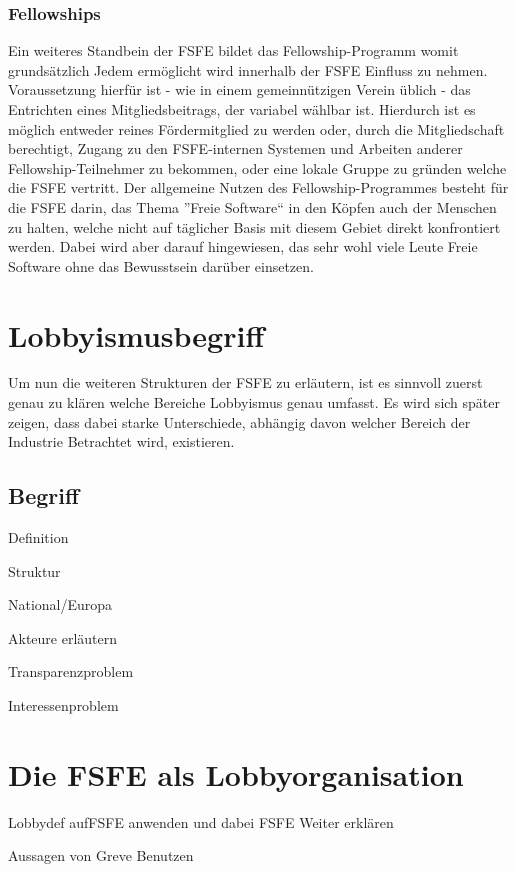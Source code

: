 \subsubsection{Fellowships}
Ein weiteres Standbein der FSFE bildet das Fellowship-Programm womit
grundsätzlich Jedem ermöglicht wird innerhalb der FSFE Einfluss zu nehmen.
Voraussetzung hierfür ist - wie in einem gemeinnützigen Verein üblich - das 
Entrichten eines Mitgliedsbeitrags, der variabel
wählbar ist. Hierdurch ist es möglich entweder reines Fördermitglied zu werden
oder, durch die Mitgliedschaft berechtigt, Zugang zu den FSFE-internen Systemen 
und Arbeiten anderer Fellowship-Teilnehmer zu bekommen, oder eine lokale Gruppe
zu gründen welche die FSFE vertritt. Der allgemeine Nutzen des 
Fellowship-Programmes besteht für die FSFE darin, das Thema ''Freie Software`` 
in 
den Köpfen auch der Menschen zu halten, welche nicht auf täglicher Basis mit 
diesem Gebiet direkt konfrontiert werden. Dabei wird aber darauf hingewiesen, 
das sehr wohl viele Leute Freie Software ohne das Bewusstsein darüber einsetzen.
\cite{PLGreveInterView}



\newpage
\section{Lobbyismusbegriff}
Um nun die weiteren Strukturen der FSFE zu erläutern, ist es sinnvoll zuerst 
genau zu klären welche Bereiche Lobbyismus genau umfasst. Es wird sich später 
zeigen, dass dabei starke Unterschiede, abhängig davon welcher Bereich der 
Industrie Betrachtet wird, existieren.
\subsection{Begriff}
\begin{itemize*}
    \item Definition \cite{LeifSpeth200312}
    \item Struktur
    \item National/Europa
    \item Akteure erläutern
    \item Transparenzproblem
	\item Interessenproblem
\end{itemize*}

\section{Die FSFE als Lobbyorganisation}
\begin{itemize*}
    \item Lobbydef aufFSFE  anwenden und dabei FSFE Weiter erklären
    \item Aussagen von Greve Benutzen \cite{PLGreveInterView}
\end{itemize*}

